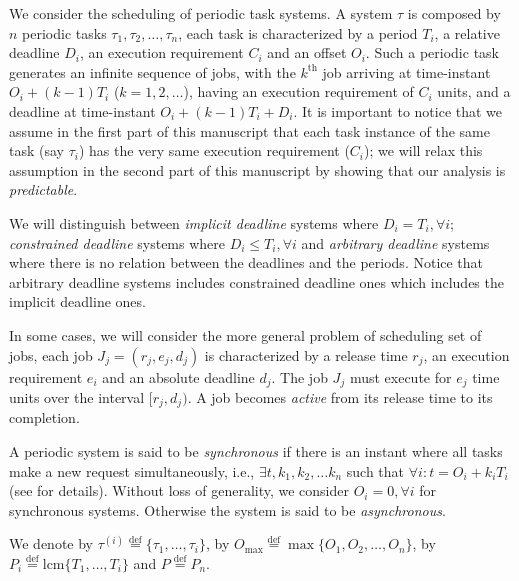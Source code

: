 \documentclass[a4paper,11pt]{article}
\newcommand{\equals}{\stackrel{\mathrm{def}}{=}}
\newcommand{\lcm}{\mathrm{lcm}}
\begin{document}
We consider the scheduling of periodic task systems. A
system $\tau$ is composed by $n$ periodic tasks $\tau_1,
\tau_2, \ldots, \tau_n$, each task is characterized by a
period $T_i$, a relative deadline $D_i$, an execution requirement 
$C_i$ and an offset $O_i$. Such a periodic task generates an
infinite sequence of jobs, with the $k^{\text{th}}$ job
arriving at time-instant $O_{i}+ (k - 1)T_i$ ($k = 1, 2,
\ldots$), having an execution requirement of $C_{i}$ units,
and a deadline at time-instant $O_{i}+ (k-1)T_{i}+
D_{i}.$ It is important to notice that we assume in the
first part of this manuscript that each task instance of
the same task (say $\tau_{i}$) has the very same execution
requirement ($C_{i}$); we will relax this assumption in
the second part of this manuscript by showing that our
analysis is \emph{predictable}.

We will distinguish between {\it implicit deadline} systems where
$D_i=T_i, \forall i$; {\it constrained deadline} systems where $D_i
\leq T_i, \forall i$ and {\it arbitrary deadline} systems where there
is no relation between the deadlines and the periods.
Notice that arbitrary deadline systems includes
constrained deadline ones which includes the implicit deadline ones.

In some cases, we will consider the more general problem of
scheduling set of jobs, each job $J_j=(r_j,e_j,d_j)$ is characterized
by a release time $r_j$, an execution requirement $e_i$ and an absolute
 deadline $d_j$. The job $J_j$ must execute for $e_j$ time units over
the interval $[r_j,d_j)$. A job becomes {\em active} from its release
time to its completion.

A periodic system is said to be {\it synchronous} if there is an instant where
all tasks make a new request simultaneously, i.e., $\exists t, k_1,
k_2, \ldots k_n$ such that $\forall i: t=O_i+k_iT_i$ (see
\cite{goossens5} for details). Without loss of generality, we consider
$O_i= 0, \forall i$ for synchronous systems. Otherwise
the system is said to be {\it asynchronous}.

We denote by $\tau^{(i)} \equals \{\tau_1, \ldots, \tau_i\}$,
by $O_{\max} \equals \max \{O_1, O_2, \ldots, O_n \}$, by $P_i \equals
\lcm \{T_1,\ldots, T_i\}$ and $P \equals P_n$.
\end{document}
